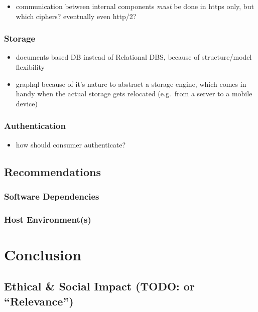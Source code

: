 \documentclass[12pt,english,a4paper,titlepage,cleardoublepage=empty,dottedtoc]{report}
\providecommand{\tightlist}{%
  \setlength{\itemsep}{0pt}\setlength{\parskip}{0pt}}
\begin{document}
\begin{itemize}
\tightlist
\item
  communication between internal components \emph{must} be done in https
  only, but which ciphers? eventually even http/2?
\end{itemize}

\subsection{Storage}\label{storage}

\begin{itemize}
\tightlist
\item
  documents based DB instead of Relational DBS, because of
  structure/model flexibility
\item
  graphql because of it's nature to abstract a storage engine, which
  comes in handy when the actual storage gets relocated (e.g.~from a
  server to a mobile device)
\end{itemize}

\subsection{Authentication}\label{authentication-2}

\begin{itemize}
\tightlist
\item
  how should consumer authenticate?
\end{itemize}

\section{Recommendations}\label{recommendations}

\subsection{Software Dependencies}\label{software-dependencies}

\subsection{Host Environment(s)}\label{host-environments}

\chapter{Conclusion}\label{conclusion}

\section{\texorpdfstring{Ethical \& Social Impact (TODO: or
``Relevance'')}{Ethical \& Social Impact (TODO: or Relevance)}}\label{ethical-social-impact-todo-or-relevance}
\end{document}
